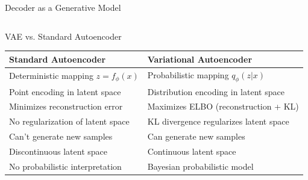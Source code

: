 \documentclass[5pt,aspectratio=169]{beamer}
\begin{document}
\begin{frame}{Decoder as a Generative Model}
\begin{columns}
  \end{columns}
\end{frame}



\begin{frame}{VAE vs. Standard Autoencoder}
  \begin{center}
    \begin{tabular}{p{6cm}|p{6cm}}
      \toprule
      \textbf{Standard Autoencoder} & \textbf{Variational Autoencoder} \\
      \midrule
      Deterministic mapping $z = f_\phi(x)$ & Probabilistic mapping $q_\phi(z|x)$ \\
      \midrule
      Point encoding in latent space & Distribution encoding in latent space \\
      \midrule
      Minimizes reconstruction error & Maximizes ELBO (reconstruction + KL) \\
      \midrule
      No regularization of latent space & KL divergence regularizes latent space \\
      \midrule
      Can't generate new samples & Can generate new samples \\
      \midrule
      Discontinuous latent space & Continuous latent space \\
      \midrule
      No probabilistic interpretation & Bayesian probabilistic model \\
      \bottomrule
    \end{tabular}
  \end{center}
  
 
\end{frame}
\end{document}
